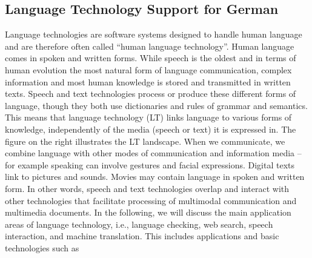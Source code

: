 \documentclass[]{../metanetpaper}
\begin{document}
	\subsection{Language Technology Support for German}
Language technologies are software systems designed to handle human language and are therefore often called “human language technology”. Human language comes in spoken and written forms. While speech is the oldest and in terms of human evolution the most natural form of language communication, complex information and most human knowledge is stored and transmitted in written texts. Speech and text technologies process or produce these different forms of language, though they both use dictionaries and rules of grammar and semantics. This means that language technology (LT) links language to various forms of knowledge, independently of the media (speech or text) it is expressed in. The figure on the right illustrates the LT landscape. When we communicate, we combine language with other modes of communication and information media – for example speaking can involve gestures and facial expressions. Digital texts link to pictures and sounds. Movies may contain language in spoken and written form. In other words, speech and text technologies overlap and interact with other technologies that facilitate processing of multimodal communication and multimedia documents. 
In the following, we will discuss the main application areas of language technology, i.e., language checking, web search, speech interaction, and machine translation. This includes applications and basic technologies such as 
\end{document}
